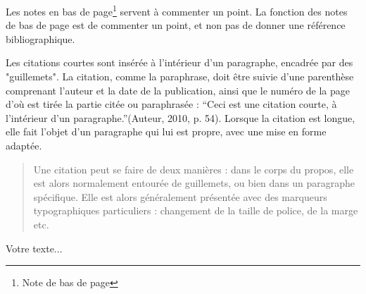 Les notes en bas de page\footnote{Note de bas de page} servent à commenter un point. La fonction des notes de bas de page est de commenter un point, et non pas de donner une référence bibliographique.

Les citations courtes sont insérée à l'intérieur d'un paragraphe, encadrée par des "guillemets". La citation, comme la paraphrase, doit être suivie d'une parenthèse comprenant l'auteur et la date de la publication, ainsi que le numéro de la page d'où est tirée la partie citée ou paraphrasée : \enquote{Ceci est une citation courte, à l'intérieur d'un paragraphe.}(Auteur, 2010, p. 54). Lorsque la citation est longue, elle fait l'objet d'un paragraphe qui lui est propre, avec une mise en forme adaptée.

\begin{quote}
	Une citation peut se faire de deux manières : dans le corps du propos, elle est alors normalement entourée de guillemets, ou bien dans un paragraphe spécifique. Elle est alors	généralement présentée avec des marqueurs typographiques particuliers : changement de la taille de police, de la marge etc.
\end{quote}

Votre texte...

